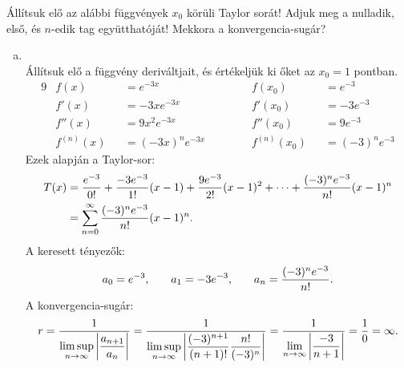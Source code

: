 \begin{exercise}{%
    Állítsuk elő az alábbi függvények $x_0$ körüli Taylor sorát!
    Adjuk meg a nulladik, első, és $n$-edik tag együtthatóját! Mekkora a
    konvergencia-sugár?
  }
{\begin{enumerate}[a)]
      \item {}\\[2mm]
            Állítsuk elő a függvény deriváltjait, és értékeljük ki őket az
            $x_0 = 1$ pontban.
            \begin{alignat*}{9}
               & f(x)       &  & = e^{-3x}                 &  & f(x_0)       &  & = e^{-3}        \\
               & f'(x)      &  & = -3xe^{-3x} \hspace{2cm} &  & f'(x_0)      &  & = -3 e^{-3}     \\
               & f''(x)     &  & = 9x^2e^{-3x}             &  & f''(x_0)     &  & = 9 e^{-3}      \\
               & f^{(n)}(x) &  & = (-3x)^n e^{-3x}         &  & f^{(n)}(x_0) &  & = (-3)^n e^{-3}
            \end{alignat*}
            Ezek alapján a Taylor-sor:
            \begin{align*}
              T(x)
               & = \frac{e^{-3}}{0!}
              + \frac{-3e^{-3}}{1!}(x - 1)
              + \frac{9e^{-3}}{2!}(x - 1)^2
              + \dots
              + \frac{(-3)^n e^{-3}}{n!} (x - 1)^n
              \\
               & = \sum_{n = 0}^\infty
              \frac{(-3)^n e^{-3}}{n!}(x - 1)^n
              \text.
            \end{align*}
            A keresett tényezők:
            \[
              a_0 = e^{-3}
              \text, \qquad
              a_1 = -3 e^{-3}
              \text, \qquad
              a_n = \frac{(-3)^n e^{-3}}{n!}
              \text.
            \]
            A konvergencia-sugár:
            \[
              r
              = \frac{1}{\displaystyle\limsup_{n \rightarrow \infty} \left|
                \dfrac{a_{n+1}}{a_n}
                \right|
              }
              = \frac{1}{\displaystyle\limsup_{n \rightarrow \infty} \left|
                \dfrac{(-3)^{n+1} \vphantom{e^{-3}}}{(n+1)!}
                \dfrac{n!}{(-3)^n \vphantom{e^{-3}}}
                \right|}
              = \frac{1}{\displaystyle\lim_{n \rightarrow \infty} \left|
                \dfrac{-3}{n+1}
                \right|}
              = \frac{1}{0}
              = \infty
              \text.
            \]
    \end{enumerate}
  }
\end{exercise}
